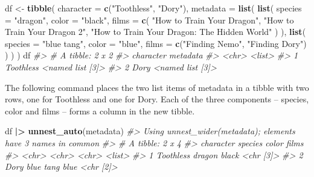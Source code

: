 \documentclass[
]{book}
\newenvironment{Shaded}{\begin{snugshade}}{\end{snugshade}}
\newcommand{\AttributeTok}[1]{\textcolor[rgb]{0.13,0.29,0.53}{#1}}
\newcommand{\CommentTok}[1]{\textcolor[rgb]{0.56,0.35,0.01}{\textit{#1}}}
\newcommand{\FunctionTok}[1]{\textcolor[rgb]{0.13,0.29,0.53}{\textbf{#1}}}
\newcommand{\NormalTok}[1]{#1}
\newcommand{\OtherTok}[1]{\textcolor[rgb]{0.56,0.35,0.01}{#1}}
\newcommand{\SpecialCharTok}[1]{\textcolor[rgb]{0.81,0.36,0.00}{\textbf{#1}}}
\newcommand{\StringTok}[1]{\textcolor[rgb]{0.31,0.60,0.02}{#1}}
\begin{document}
\begin{Shaded}
\begin{Highlighting}[]
\NormalTok{df }\OtherTok{\textless{}{-}} \FunctionTok{tibble}\NormalTok{(}
  \AttributeTok{character =} \FunctionTok{c}\NormalTok{(}\StringTok{"Toothless"}\NormalTok{, }\StringTok{"Dory"}\NormalTok{),}
  \AttributeTok{metadata =} \FunctionTok{list}\NormalTok{(}
    \FunctionTok{list}\NormalTok{(}
      \AttributeTok{species =} \StringTok{"dragon"}\NormalTok{,}
      \AttributeTok{color =} \StringTok{"black"}\NormalTok{,}
      \AttributeTok{films =} \FunctionTok{c}\NormalTok{(}
        \StringTok{"How to Train Your Dragon"}\NormalTok{,}
        \StringTok{"How to Train Your Dragon 2"}\NormalTok{,}
        \StringTok{"How to Train Your Dragon: The Hidden World"}
\NormalTok{      )}
\NormalTok{    ),}
    \FunctionTok{list}\NormalTok{(}
      \AttributeTok{species =} \StringTok{"blue tang"}\NormalTok{,}
      \AttributeTok{color =} \StringTok{"blue"}\NormalTok{,}
      \AttributeTok{films =} \FunctionTok{c}\NormalTok{(}\StringTok{"Finding Nemo"}\NormalTok{, }\StringTok{"Finding Dory"}\NormalTok{)}
\NormalTok{    )}
\NormalTok{  )}
\NormalTok{)}
\NormalTok{df}
\CommentTok{\#\textgreater{} \# A tibble: 2 x 2}
\CommentTok{\#\textgreater{}   character metadata        }
\CommentTok{\#\textgreater{}   \textless{}chr\textgreater{}     \textless{}list\textgreater{}          }
\CommentTok{\#\textgreater{} 1 Toothless \textless{}named list [3]\textgreater{}}
\CommentTok{\#\textgreater{} 2 Dory      \textless{}named list [3]\textgreater{}}
\end{Highlighting}
\end{Shaded}

The following command places the two list items of metadata in a tibble with two rows, one for Toothless and one for Dory. Each of the three components -- species, color and films -- forms a column in the new tibble.

\begin{Shaded}
\begin{Highlighting}[]
\NormalTok{df }\SpecialCharTok{|\textgreater{}} \FunctionTok{unnest\_auto}\NormalTok{(metadata)}
\CommentTok{\#\textgreater{} Using \textasciigrave{}unnest\_wider(metadata)\textasciigrave{}; elements have 3 names in common}
\CommentTok{\#\textgreater{} \# A tibble: 2 x 4}
\CommentTok{\#\textgreater{}   character species   color films    }
\CommentTok{\#\textgreater{}   \textless{}chr\textgreater{}     \textless{}chr\textgreater{}     \textless{}chr\textgreater{} \textless{}list\textgreater{}   }
\CommentTok{\#\textgreater{} 1 Toothless dragon    black \textless{}chr [3]\textgreater{}}
\CommentTok{\#\textgreater{} 2 Dory      blue tang blue  \textless{}chr [2]\textgreater{}}
\end{Highlighting}
\end{Shaded}
\end{document}
